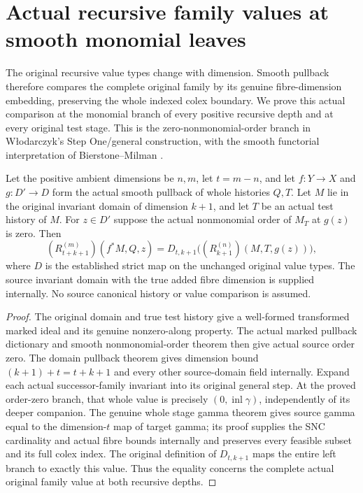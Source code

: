\section{Actual recursive family values at smooth monomial leaves}

The original recursive value types change with dimension.  Smooth pullback
therefore compares the complete original family by its genuine fibre-dimension
embedding, preserving the whole indexed colex boundary.  We prove this actual
comparison at the monomial branch of every positive recursive depth and at
every original test stage.  This is the zero-nonmonomial-order branch in
W\l odarczyk's Step One/general construction, with the smooth functorial
interpretation of Bierstone--Milman
\cite{wlodarczyk05-hironaka,bierstone-milman08-functoriality}.

\begin{theorem}
\label{hir:smooth-original-family-monomial-leaf}
\leanok
{}
Let the positive ambient dimensions be $n,m$, let $t=m-n$, and let
$f:Y\to X$ and $g:D'\to D$ form the actual smooth pullback of whole histories
$Q,T$.  Let $M$ lie in the original invariant domain of dimension $k+1$,
and let $T$ be an actual test history of $M$.  For $z\in D'$ suppose the
actual nonmonomial order of $M_T$ at $g(z)$ is zero.  Then
\[
 (R^{(m)}_{t+k+1})(f^*M,Q,z)
 =D_{t,k+1}\bigl((R^{(n)}_{k+1})(M,T,g(z))\bigr),
\]
where $D$ is the established strict map on the unchanged original value
types.  The source invariant domain with the true added fibre dimension
is supplied internally.  No source canonical history or value comparison
is assumed.
\end{theorem}
\begin{proof}
The original domain and true test history give a well-formed transformed
marked ideal and its genuine nonzero-along property.  The actual marked
pullback dictionary and smooth nonmonomial-order theorem then give actual
source order zero.  The domain pullback theorem gives dimension bound
$(k+1)+t=t+k+1$ and every other source-domain field internally.
Expand each actual successor-family invariant into its original general
step.  At the proved order-zero branch, that whole value is precisely
$(0,\operatorname{inl}\gamma)$, independently of its deeper companion.
The genuine whole stage gamma theorem gives source gamma equal to the
dimension-$t$ map of target gamma; its proof supplies the SNC cardinality
and actual fibre bounds internally and preserves every feasible subset
and its full colex index.  The original definition of $D_{t,k+1}$ maps
the entire left branch to exactly this value.  Thus the equality concerns
the complete actual original family value at both recursive depths.
\end{proof}

